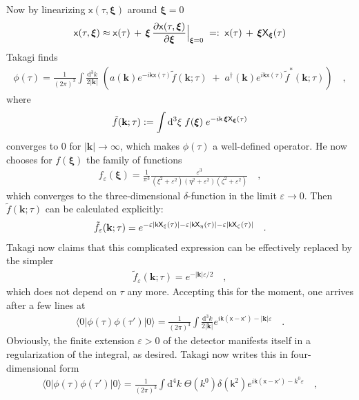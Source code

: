 \documentclass[a4paper,12pt]{article}
\newcommand{\bra}[1]{\langle #1|}
\newcommand{\ket}[1]{|#1\rangle }
\newcommand{\eps}{\varepsilon}
\newcommand{\vk}{\mathbf{k}}
\newcommand{\vxi}{\boldsymbol{\xi}}
\newcommand{\vvx}{\mathsf x}
\newcommand{\vvk}{\mathsf k}
\newcommand{\vac}{\ket{0}}
\newcommand{\cav}{\bra{0}}
\renewcommand{\d}{\mathrm{d}}
\begin{document}
Now by linearizing $\vvx(\tau,\vxi)$ around $\vxi=0$
\begin{eqnarray*}
\vvx(\tau,\vxi)\approx\vvx(\tau)\,+\,\vxi\,\frac{\partial\vvx(\tau,\vxi)}
{\partial\vxi}\Big{|}_{\vxi=0}\;=:\;\vvx(\tau)\,+\,\vxi{\sf X}_{\vxi}(\tau)
\end{eqnarray*}
Takagi finds
\begin{eqnarray*}
\phi(\tau)=\frac{1}{(2\pi)^3}\int \frac{\d^3k}{2|\vk|}\;
\left( a(\vk)e^{-i\vvk\vvx(\tau)}{\tilde f}(\vk;\tau)\; + 
\;a^\dag(\vk)e^{i\vvk\vvx(\tau)}{\tilde f}^*(\vk;\tau)\right)\quad,
\end{eqnarray*}
where
\begin{eqnarray*}
{\tilde f}(\vk;\tau):=\int \d^3\xi\;f(\vxi)\;
e^{-i\vvk\,\vxi{\sf X}_{\vxi}(\tau)}
\end{eqnarray*}
converges to $0$ for $|\vk|\to\infty$, which makes $\phi(\tau)$ a well-defined operator.
He now chooses for $f(\vxi)$ the family of functions
\begin{eqnarray*}
f_{\eps}(\vxi)=\frac{1}{\pi^3}\frac{\eps^3}
{(\xi^2+\eps^2)(\eta^2+\eps^2)(\zeta^2+\eps^2)}\quad,
\end{eqnarray*}
which converges to the three-dimensional $\delta$-function in the limit $\eps\to0$.
Then ${\tilde f}(\vk;\tau)$ can be calculated explicitly:
\begin{eqnarray}
\label{eq:feig}
{\tilde f}_{\eps}(\vk;\tau)=e^{-\eps|\vvk{\sf X}_{\xi}(\tau)|-
\eps|\vvk{\sf X}_{\eta}(\tau)|-\eps|\vvk{\sf X}_{\zeta}(\tau)|}\quad.
\end{eqnarray}
Takagi now claims that this complicated expression can be effectively replaced by the
simpler
\begin{eqnarray}
\label{eq:fein}
{\tilde f}_{\eps}(\vk;\tau)=e^{-|\vk|\eps/2}\quad,
\end{eqnarray}
which does not depend on $\tau$ any more. Accepting this for the moment, one arrives
after a few lines at
\begin{eqnarray}
\label{eq:tcf}
\cav\phi(\tau)\phi(\tau')\vac=
\frac{1}{(2\pi)^3}\int\frac{\d^3k}{2|\vk|}e^{i\vvk(\vvx-\vvx')-
|\vk|\eps}\quad.
\end{eqnarray}
Obviously, the finite extension $\eps>0$ of the detector manifests itself in a 
regularization of the integral, as desired.
Takagi now writes this in four-dimensional form
\begin{eqnarray}
\label{eq:tcf4d}
\cav\phi(\tau)\phi(\tau')\vac=\frac{1}{(2\pi)^3}\int \d^4k\;\Theta(k^0)
\delta(\vvk^2)e^{i\vvk(\vvx-\vvx')-k^0\eps}\quad,
\end{eqnarray}
\end{document}
